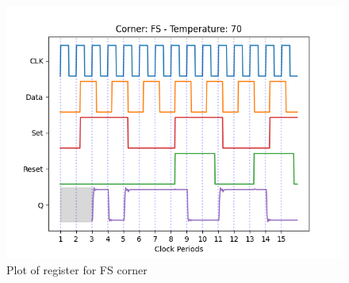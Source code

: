 \begin{figure}[H]
    \centering
    \begin{minipage}{0.5\textwidth}
        \centering
        \includegraphics[width=\textwidth]{Figures/Aimspice_Plots/FS_70.png}
        \caption{Plot of register for FS corner}
        \label{figFS70}
    \end{minipage}%
\end{figure}

